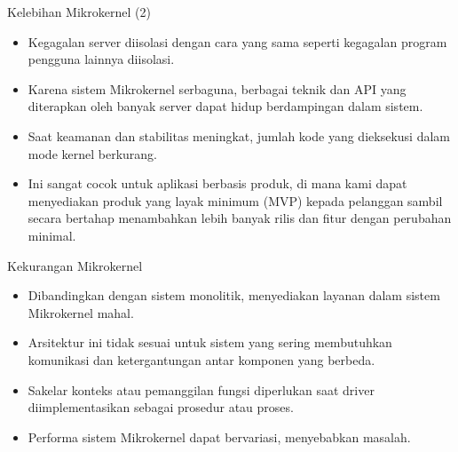 \documentclass[aspectratio=169, table]{beamer}
\begin{document}
	\begin{frame}{Kelebihan Mikrokernel (2)}
	\begin{itemize}
		
			\item Kegagalan server diisolasi dengan cara yang sama seperti kegagalan program pengguna lainnya diisolasi.
		
		\item Karena sistem Mikrokernel serbaguna, berbagai teknik dan API yang diterapkan oleh banyak server dapat hidup berdampingan dalam sistem.
		
		\item Saat keamanan dan stabilitas meningkat, jumlah kode yang dieksekusi dalam mode kernel berkurang.
		
		\item Ini sangat cocok untuk aplikasi berbasis produk, di mana kami dapat menyediakan produk yang layak minimum (MVP) kepada pelanggan sambil secara bertahap menambahkan lebih banyak rilis dan fitur dengan perubahan minimal.
		
	\end{itemize}
\end{frame}

	\begin{frame}{Kekurangan Mikrokernel}
		
		\begin{itemize}
			\item Dibandingkan dengan sistem monolitik, menyediakan layanan dalam sistem Mikrokernel mahal.
			
			\item Arsitektur ini tidak sesuai untuk sistem yang sering membutuhkan komunikasi dan ketergantungan antar komponen yang berbeda.
			
			\item Sakelar konteks atau pemanggilan fungsi diperlukan saat driver diimplementasikan sebagai prosedur atau proses.
			
			\item Performa sistem Mikrokernel dapat bervariasi, menyebabkan masalah.
		\end{itemize}
	\end{frame}
\end{document}
